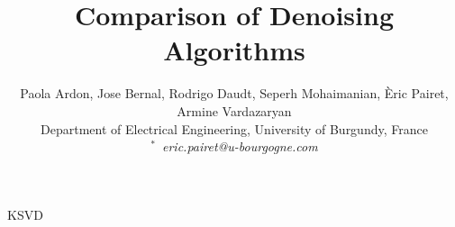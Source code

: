 \documentclass[12pt,journal,compsoc]{IEEEtran}
\begin{document}
\title{Comparison of Denoising Algorithms}
\author{Paola Ardon, Jose Bernal, Rodrigo Daudt, Seperh Mohaimanian, \`Eric Pairet, Armine Vardazaryan
\vspace{0.2cm} \\
        \small{Department of Electrical Engineering, University of Burgundy, France \\
        $^*\,$ \textit{eric.pairet@u-bourgogne.com} \\
        }}
        
 {KSVD}
\setlength\headheight{26pt}


\maketitle




%
%
%

%
%



\end{document}
